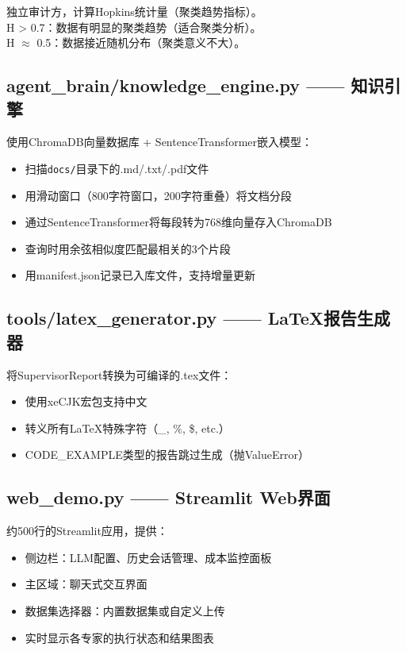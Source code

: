 \documentclass[11pt,a4paper]{ctexbook}
\begin{document}
独立审计方，计算Hopkins统计量（聚类趋势指标）。\\[2pt]
H > 0.7：数据有明显的聚类趋势（适合聚类分析）。\\[2pt]
H $\approx$ 0.5：数据接近随机分布（聚类意义不大）。

\subsection{agent\_brain/knowledge\_engine.py —— 知识引擎}

使用ChromaDB向量数据库 + SentenceTransformer嵌入模型：
\begin{itemize}
    \item 扫描\verb|docs/|目录下的.md/.txt/.pdf文件
    \item 用滑动窗口（800字符窗口，200字符重叠）将文档分段
    \item 通过SentenceTransformer将每段转为768维向量存入ChromaDB
    \item 查询时用余弦相似度匹配最相关的3个片段
    \item 用manifest.json记录已入库文件，支持增量更新
\end{itemize}

\subsection{tools/latex\_generator.py —— LaTeX报告生成器}

将SupervisorReport转换为可编译的.tex文件：
\begin{itemize}
    \item 使用xeCJK宏包支持中文
    \item 转义所有LaTeX特殊字符（\_, \%, \$, etc.）
    \item CODE\_EXAMPLE类型的报告跳过生成（抛ValueError）
\end{itemize}

\subsection{web\_demo.py —— Streamlit Web界面}

约500行的Streamlit应用，提供：
\begin{itemize}
    \item 侧边栏：LLM配置、历史会话管理、成本监控面板
    \item 主区域：聊天式交互界面
    \item 数据集选择器：内置数据集或自定义上传
    \item 实时显示各专家的执行状态和结果图表
\end{itemize}
\end{document}
